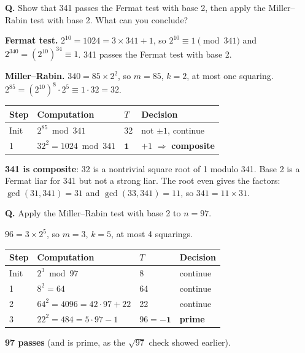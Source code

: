 \begin{worked}
\textbf{Q.} Show that 341 passes the Fermat test with base 2, then apply the Miller--Rabin test with base 2. What can you conclude?

\textbf{Fermat test.} $2^{10} = 1024 = 3 \times 341 + 1$, so $2^{10} \equiv 1 \pmod{341}$ and $2^{340} = (2^{10})^{34} \equiv 1$. 341 passes the Fermat test with base 2.

\textbf{Miller--Rabin.} $340 = 85 \times 2^2$, so $m = 85$, $k = 2$, at most one squaring. $2^{85} = (2^{10})^{8} \cdot 2^5 \equiv 1 \cdot 32 = 32$.
\begin{center}\small
\begin{tabular}{@{}llll@{}}
\toprule
Step & Computation & $T$ & Decision\\
\midrule
Init & $2^{85} \bmod 341$ & 32 & not $\pm1$, continue\\
1 & $32^2 = 1024 \bmod 341$ & $\mathbf{1}$ & $+1$ $\Rightarrow$ \textbf{composite}\\
\bottomrule
\end{tabular}
\end{center}
\textbf{341 is composite}: 32 is a nontrivial square root of 1 modulo 341. Base 2 is a Fermat liar for 341 but not a strong liar. The root even gives the factors: $\gcd(31, 341) = 31$ and $\gcd(33, 341) = 11$, so $341 = 11 \times 31$.
\end{worked}

\begin{worked}
\textbf{Q.} Apply the Miller--Rabin test with base 2 to $n = 97$.

$96 = 3 \times 2^5$, so $m = 3$, $k = 5$, at most 4 squarings.
\begin{center}\small
\begin{tabular}{@{}llll@{}}
\toprule
Step & Computation & $T$ & Decision\\
\midrule
Init & $2^3 \bmod 97$ & 8 & continue\\
1 & $8^2 = 64$ & 64 & continue\\
2 & $64^2 = 4096 = 42 \cdot 97 + 22$ & 22 & continue\\
3 & $22^2 = 484 = 5 \cdot 97 - 1$ & $96 = \mathbf{-1}$ & \textbf{prime}\\
\bottomrule
\end{tabular}
\end{center}
\textbf{97 passes} (and is prime, as the $\sqrt{97}$ check showed earlier).
\end{worked}

